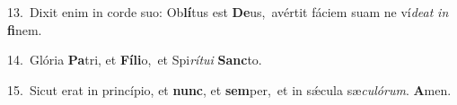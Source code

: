 {\numbfont\textcolor{\numbcolor}{13.}}~Dixit enim in corde suo: Ob\-\textbf{lí}\-tus est \textbf{De}\-us,~\star avértit fáciem suam ne ví\-\textit{de}\-\textit{at} \textit{in} \textbf{fi}\-nem.\par
{\numbfont\textcolor{\numbcolor}{14.}}~Glória \textbf{Pa}\-tri, et \textbf{Fí}\-\textbf{li}o,~\star et Spi\-\textit{rí}\-\textit{tu}\textit{i} \textbf{Sanc}\-to.\par
{\numbfont\textcolor{\numbcolor}{15.}}~Sicut erat in princípio, et \textbf{nunc}\-, et \textbf{sem}\-per,~\star et in sǽcula sæ\-\textit{cu}\-\textit{ló}\textit{rum}. \textbf{A}\-men.\par
